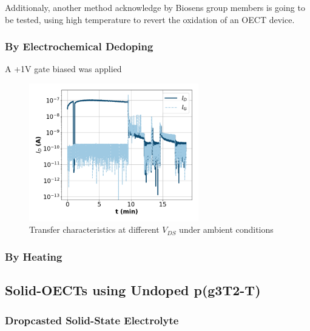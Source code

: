 Additionaly, another method acknowledge by Biosens group members is going to be tested, using high temperature to revert the oxidation of an OECT device.  

\subsubsection{By Electrochemical Dedoping}
A +1V gate biased was applied 

\begin{figure}[ht]
    \centering
    \includegraphics[height=6cm]{Images/pdf/elec-dedop1.pdf}
    \caption[Transfer characteristics after dedoping]{Transfer characteristics at different $V_{DS}$ under ambient conditions}
    \label{fig:revox2}
\end{figure}


\subsubsection{By Heating}


\subsection{Solid-OECTs using Undoped p(g3T2-T)}




\subsubsection{Dropcasted Solid-State Electrolyte}

